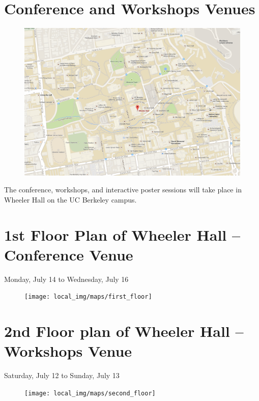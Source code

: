 \clearpage
{} \section{Conference and Workshops Venues}
\begin{figure}[h!]
\includegraphics[width=\linewidth]{local_img/maps/wheeler_hall}
\end{figure}

The conference, workshops, and interactive poster sessions will take place in Wheeler Hall on the UC Berkeley campus. 

\newpage
{} \section{1st Floor Plan of Wheeler Hall -- Conference Venue}
{\large Monday, July 14 to Wednesday, July 16}
\begin{figure}[h!]
\center
\texttt{[image: local\_img/maps/first\_floor]}
\end{figure}

\newpage
{} \section{2nd Floor plan of Wheeler Hall -- Workshops Venue}
{\large Saturday, July 12 to Sunday, July 13}

\begin{figure}[h!]
\center
\texttt{[image: local\_img/maps/second\_floor]}
\end{figure}

\clearpage

